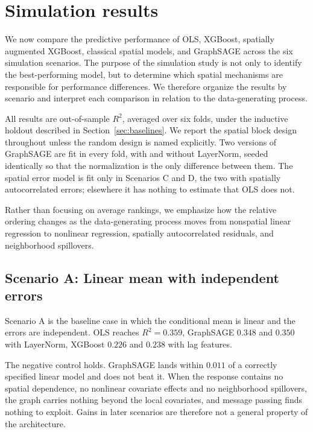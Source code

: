 \documentclass[ASNA, twocolumn]{USG} %
\begin{document}
\section{Simulation results}
\label{sec:results}

We now compare the predictive performance of OLS, XGBoost, spatially augmented XGBoost, classical spatial models, and GraphSAGE across the six simulation scenarios. The purpose of the simulation study is not only to identify the best-performing model, but to determine which spatial mechanisms are responsible for performance differences. We therefore organize the results by scenario and interpret each comparison in relation to the data-generating process.

All results are out-of-sample \(R^2\), averaged over six folds, under the inductive holdout described in Section~\ref{sec:baselines}. We report the spatial block design throughout unless the random design is named explicitly. Two versions of GraphSAGE are fit in every fold, with and without LayerNorm, seeded identically so that the normalization is the only difference between them. The spatial error model is fit only in Scenarios C and D, the two with spatially autocorrelated errors; elsewhere it has nothing to estimate that OLS does not.

Rather than focusing on average rankings, we emphasize how the relative ordering changes as the data-generating process moves from nonspatial linear regression to nonlinear regression, spatially autocorrelated residuals, and neighborhood spillovers.

\subsection{Scenario A: Linear mean with independent errors}

Scenario A is the baseline case in which the conditional mean is linear and the errors are independent. OLS reaches \(R^2 = 0.359\), GraphSAGE \(0.348\) and \(0.350\) with LayerNorm, XGBoost \(0.226\) and \(0.238\) with lag features.

The negative control holds. GraphSAGE lands within \(0.011\) of a correctly specified linear model and does not beat it. When the response contains no spatial dependence, no nonlinear covariate effects and no neighborhood spillovers, the graph carries nothing beyond the local covariates, and message passing finds nothing to exploit. Gains in later scenarios are therefore not a general property of the architecture.
\end{document}
